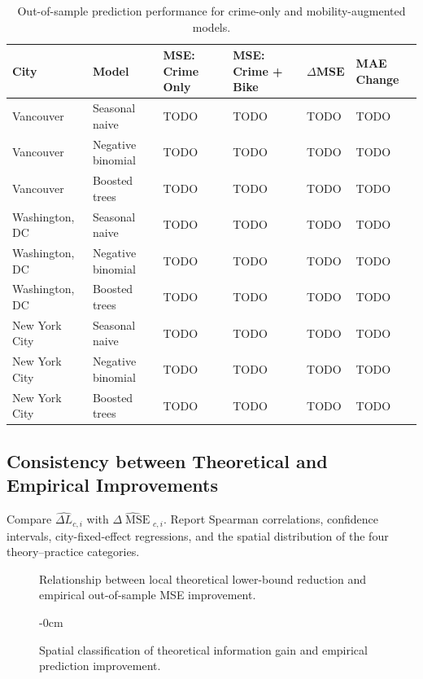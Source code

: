 \documentclass[applsci,article,submit,moreauthors]{Definitions/mdpi}
\begin{document}
\begin{table}[H]
\caption{Out-of-sample prediction performance for crime-only and mobility-augmented models.}
\label{tab:prediction_results}
\begin{tabularx}{\textwidth}{llXXXX}
\toprule
\textbf{City} & \textbf{Model} & \textbf{MSE: Crime Only} & \textbf{MSE: Crime + Bike} & $\Delta\textbf{MSE}$ & \textbf{MAE Change}\\
\midrule
Vancouver & Seasonal naive & TODO & TODO & TODO & TODO\\
Vancouver & Negative binomial & TODO & TODO & TODO & TODO\\
Vancouver & Boosted trees & TODO & TODO & TODO & TODO\\
Washington, DC & Seasonal naive & TODO & TODO & TODO & TODO\\
Washington, DC & Negative binomial & TODO & TODO & TODO & TODO\\
Washington, DC & Boosted trees & TODO & TODO & TODO & TODO\\
New York City & Seasonal naive & TODO & TODO & TODO & TODO\\
New York City & Negative binomial & TODO & TODO & TODO & TODO\\
New York City & Boosted trees & TODO & TODO & TODO & TODO\\
\bottomrule
\end{tabularx}
\end{table}

\subsection{Consistency between Theoretical and Empirical Improvements}
\label{subsec:results_theory_practice}

Compare $\widehat{\Delta L}_{c,i}$ with $\widehat{\Delta\operatorname{MSE}}_{c,i}$. Report Spearman correlations, confidence intervals, city-fixed-effect regressions, and the spatial distribution of the four theory--practice categories.

\begin{figure}[H]
\centering
{}
\caption{Relationship between local theoretical lower-bound reduction and empirical out-of-sample MSE improvement.}
\label{fig:theory_practice_scatter}
\end{figure}

\begin{figure}[H]
\begin{adjustwidth}{-\extralength}{0cm}
\centering
{}
\end{adjustwidth}
\caption{Spatial classification of theoretical information gain and empirical prediction improvement.}
\label{fig:theory_practice_maps}
\end{figure}
\end{document}
